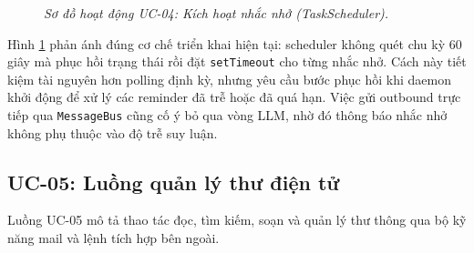 \begin{figure}[p]
{
  }
  \caption{\emph{Sơ đồ hoạt động UC-04: Kích hoạt nhắc nhở (TaskScheduler).}}
  \label{fig:activity-uc04}
\end{figure}
\clearpage

Hình \ref{fig:activity-uc04} phản ánh đúng cơ chế triển khai hiện tại: scheduler không quét chu kỳ 60 giây mà phục hồi trạng thái rồi đặt \texttt{setTimeout} cho từng nhắc nhở. Cách này tiết kiệm tài nguyên hơn polling định kỳ, nhưng yêu cầu bước phục hồi khi daemon khởi động để xử lý các reminder đã trễ hoặc đã quá hạn. Việc gửi outbound trực tiếp qua \texttt{MessageBus} cũng cố ý bỏ qua vòng LLM, nhờ đó thông báo nhắc nhở không phụ thuộc vào độ trễ suy luận.

\subsection{UC-05: Luồng quản lý thư điện tử}
Luồng UC-05 mô tả thao tác đọc, tìm kiếm, soạn và quản lý thư thông qua bộ kỹ năng mail và lệnh tích hợp bên ngoài.

